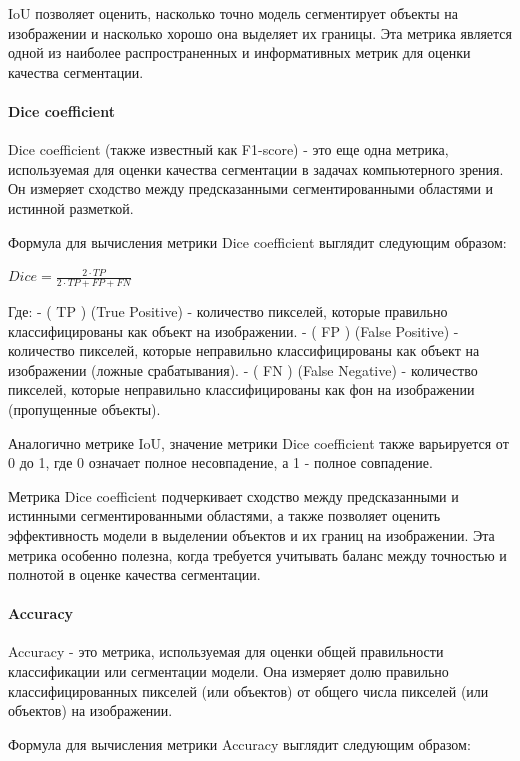 \documentclass[11pt]{article}
\begin{document}
IoU позволяет оценить, насколько точно модель сегментирует объекты на
изображении и насколько хорошо она выделяет их границы. Эта метрика
является одной из наиболее распространенных и информативных метрик для
оценки качества сегментации.

    \hypertarget{dice-coefficient}{%
\paragraph{Dice coefficient}\label{dice-coefficient}}

Dice coefficient (также известный как F1-score) - это еще одна метрика,
используемая для оценки качества сегментации в задачах компьютерного
зрения. Он измеряет сходство между предсказанными сегментированными
областями и истинной разметкой.

Формула для вычисления метрики Dice coefficient выглядит следующим
образом:

\(Dice = \frac{2 \cdot TP}{2 \cdot TP + FP + FN}\)

Где: - ( TP ) (True Positive) - количество пикселей, которые правильно
классифицированы как объект на изображении. - ( FP ) (False Positive) -
количество пикселей, которые неправильно классифицированы как объект на
изображении (ложные срабатывания). - ( FN ) (False Negative) -
количество пикселей, которые неправильно классифицированы как фон на
изображении (пропущенные объекты).

Аналогично метрике IoU, значение метрики Dice coefficient также
варьируется от 0 до 1, где 0 означает полное несовпадение, а 1 - полное
совпадение.

Метрика Dice coefficient подчеркивает сходство между предсказанными и
истинными сегментированными областями, а также позволяет оценить
эффективность модели в выделении объектов и их границ на изображении.
Эта метрика особенно полезна, когда требуется учитывать баланс между
точностью и полнотой в оценке качества сегментации.

    \hypertarget{accuracy}{%
\paragraph{Accuracy}\label{accuracy}}

Accuracy - это метрика, используемая для оценки общей правильности
классификации или сегментации модели. Она измеряет долю правильно
классифицированных пикселей (или объектов) от общего числа пикселей (или
объектов) на изображении.

Формула для вычисления метрики Accuracy выглядит следующим образом:
\end{document}
